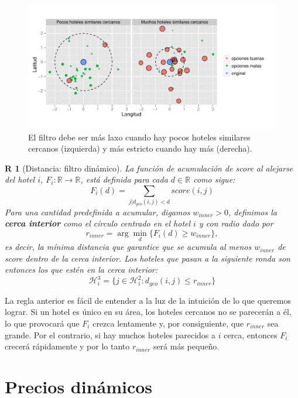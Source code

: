 \documentclass[12pt]{report}
\newcommand{\R}{\mathbb{R}}
\newcommand{\HH}{\mathcal{H}}
\newtheorem{regla}{R}%
\begin{document}
\begin{figure}[ht]
	\centering
	\includegraphics[width=\textwidth]{imagenes/distdin.pdf}
	\caption{\label{fig:distdin} El filtro debe ser más laxo cuando hay pocos hoteles similares cercanos (izquierda) y más estricto cuando hay más (derecha).}
\end{figure}
\begin{regla}[Distancia: filtro dinámico] \label{r:distanciadinamica}
La función de acumulación de score al alejarse del hotel $i$, $F_i: \R \to \R$, está definida para cada $d \in \R$ como sigue:
\[
F_i(d) = \sum_{j | d_{geo}(i,j) < d} score(i,j)
\]
Para una cantidad predefinida a acumular, digamos $w_{inner} > 0$, definimos la \textbf{cerca interior} como el círculo centrado en el hotel $i$ y con radio dado por
\[
r_{inner} = \arg\min_d \{F_i(d) \geq w_{inner}\},
\]
es decir, la mínima distancia que garantice que se acumula al menos $w_{inner}$ de \emph{score} dentro de la cerca interior. Los hoteles que pasan a la siguiente ronda son entonces los que estén en la cerca interior:
\[
\HH_i^3 = \{j \in \HH_i^2 : d_{geo}(i,j) \leq r_{inner}\}
\]
\end{regla}
La regla anterior es fácil de entender a la luz de la intuición de lo que queremos lograr. Si un hotel es único en su área, los hoteles cercanos no se parecerán a él, lo que provocará que $F_i$ crezca lentamente y, por consiguiente, que $r_{inner}$ sea grande. Por el contrario, si hay muchos hoteles parecidos a $i$ cerca, entonces $F_i$ crecerá rápidamente y por lo tanto $r_{inner}$ será más pequeño.

\section{Precios dinámicos}
\end{document}
